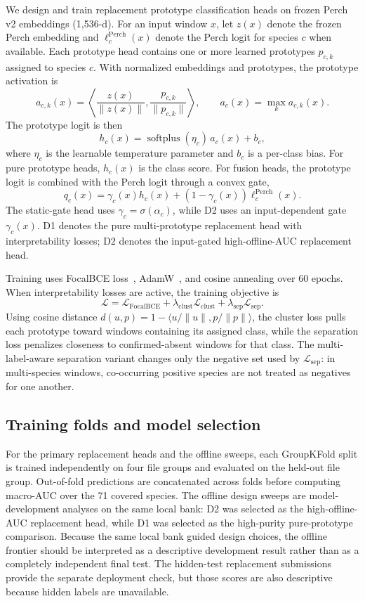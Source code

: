 \documentclass{ceurart}
\begin{document}
We design and train replacement prototype classification heads on frozen Perch v2 embeddings (1,536-d). For an input window $x$, let $z(x)$ denote the frozen Perch embedding and $\ell_c^{\mathrm{Perch}}(x)$ denote the Perch logit for species $c$ when available. Each prototype head contains one or more learned prototypes $p_{c,k}$ assigned to species $c$. With normalized embeddings and prototypes, the prototype activation is
\[
  a_{c,k}(x)=\left\langle \frac{z(x)}{\|z(x)\|},\frac{p_{c,k}}{\|p_{c,k}\|}\right\rangle,
  \qquad
  a_c(x)=\max_k a_{c,k}(x).
\]
The prototype logit is then
\[
  h_c(x)=\operatorname{softplus}(\eta_c)\,a_c(x)+b_c,
\]
where $\eta_c$ is the learnable temperature parameter and $b_c$ is a per-class bias. For pure prototype heads, $h_c(x)$ is the class score. For fusion heads, the prototype logit is combined with the Perch logit through a convex gate,
\[
  q_c(x)=\gamma_c(x)h_c(x)+(1-\gamma_c(x))\ell_c^{\mathrm{Perch}}(x).
\]
The static-gate head uses $\gamma_c=\sigma(\alpha_c)$, while D2 uses an input-dependent gate $\gamma_c(x)$. D1 denotes the pure multi-prototype replacement head with interpretability losses; D2 denotes the input-gated high-offline-AUC replacement head.

Training uses FocalBCE loss~\cite{lin2017focal}, AdamW~\cite{loshchilov2019adamw}, and cosine annealing over 60 epochs. When interpretability losses are active, the training objective is
\[
  \mathcal{L}=\mathcal{L}_{\mathrm{FocalBCE}}+\lambda_{\mathrm{clust}}\mathcal{L}_{\mathrm{clust}}+\lambda_{\mathrm{sep}}\mathcal{L}_{\mathrm{sep}}.
\]
Using cosine distance $d(u,p)=1-\langle u/\|u\|,p/\|p\|\rangle$, the cluster loss pulls each prototype toward windows containing its assigned class, while the separation loss penalizes closeness to confirmed-absent windows for that class. The multi-label-aware separation variant changes only the negative set used by $\mathcal{L}_{\mathrm{sep}}$: in multi-species windows, co-occurring positive species are not treated as negatives for one another.

\subsection{Training folds and model selection}
\label{sec:modelselection}

For the primary replacement heads and the offline sweeps, each GroupKFold split is trained independently on four file groups and evaluated on the held-out file group. Out-of-fold predictions are concatenated across folds before computing macro-AUC over the 71 covered species. The offline design sweeps are model-development analyses on the same local bank: D2 was selected as the high-offline-AUC replacement head, while D1 was selected as the high-purity pure-prototype comparison. Because the same local bank guided design choices, the offline frontier should be interpreted as a descriptive development result rather than as a completely independent final test. The hidden-test replacement submissions provide the separate deployment check, but those scores are also descriptive because hidden labels are unavailable.
\end{document}
